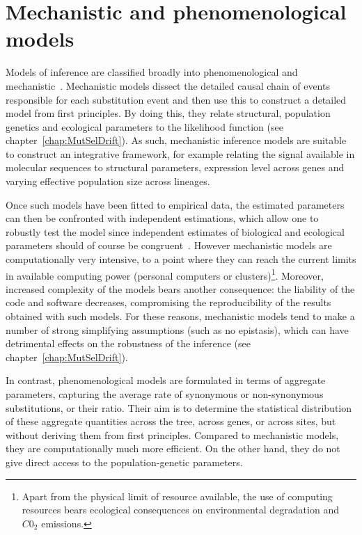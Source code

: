 \section{Mechanistic and phenomenological models}
\label{sec:mechanistic-and-phenomenological-models}

Models of inference are classified broadly into phenomenological and mechanistic~\citep{Rodrigue2010a}.
Mechanistic models dissect the detailed causal chain of events responsible for each substitution event and then use this to construct a detailed model from first principles.
By doing this, they relate structural, population genetics and ecological parameters to the likelihood function (see chapter~\ref{chap:MutSelDrift}).
As such, mechanistic inference models are suitable to construct an integrative framework, for example relating the signal available in molecular sequences to structural parameters, expression level across genes and varying effective population size across lineages.

Once such models have been fitted to empirical data, the estimated parameters can then be confronted with independent estimations, which allow one to robustly test the model since independent estimates of biological and ecological parameters should of course be congruent~\citep{Dasmeh2014}.
However mechanistic models are computationally very intensive, to a point where they can reach the current limits in available computing power (personal computers or clusters)\footnote{Apart from the physical limit of resource available, the use of computing resources bears ecological consequences on environmental degradation and $C0_2$ emissions.}.
Moreover, increased complexity of the models bears another consequence: the liability of the code and software decreases, compromising the reproducibility of the results obtained with such models.
For these reasons, mechanistic models tend to make a number of strong simplifying assumptions (such as no epistasis), which can have detrimental effects on the robustness of the inference (see chapter~\ref{chap:MutSelDrift}).

In contrast, phenomenological models are formulated in terms of aggregate parameters, capturing the average rate of synonymous or non-synonymous substitutions, or their ratio.
Their aim is to determine the statistical distribution of these aggregate quantities across the tree, across genes, or across sites, but without deriving them from first principles.
Compared to mechanistic models, they are computationally much more efficient.
On the other hand, they do not give direct access to the population-genetic parameters.


